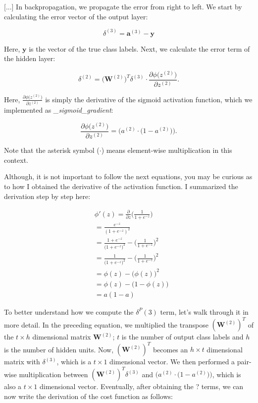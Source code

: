 \documentclass[letterpaper]{report}
\begin{document}
[...] In backpropagation, we propagate the error from right to left. We start by calculating the error vector of the output layer:

\[
\delta^{(3)} = \mathbf{a}^{(3)} - \mathbf{y} 
\]

Here, $\mathbf{y}$ is the vector of the true class labels. Next, we calculate the error term of the hidden layer:

\[
\delta^{(2)} = \big( \mathbf{W}^{(2)}  \big)^T \delta^{(3)} \cdot \frac{\partial \phi \big( z^{(2)} \big) }{\partial z^{(2)}}
.\]

Here, $\frac{\partial \phi \big( z^{(2)} \big)}{\partial z^{(2)}}$ is simply the derivative of the sigmoid activation function, which we implemented as \textit{\_sigmoid\_gradient}:

\[
\frac{\partial \phi \big( z^{(2)} \big)}{\partial z^{(2)}} = \Big( a^{(2)} \cdot \big( 1 - a^{(2)} \big) \Big).
\]

Note that the asterisk symbol ($\cdot$) means element-wise multiplication in this context.

Although, it is not important to follow the next equations, you may be curious as to how I obtained the derivative of the activation function. I summarized the derivation step by step here:

\begin{equation*} 
\begin{split}
& \phi' (z) = \frac{\partial}{\partial z} \Big( \frac{1}{1 + e^{-z}} \Big) \\
& = \frac{e^{-z}}{(1 + e^{-z})^2} \\
& = \frac{1 + e^{-z}}{\big( 1 + e^{-z} \big)^2} - \Big( \frac{1}{1 + e^{-z}}  \Big)^2  \\
& = \frac{1}{\big( 1 + e^{-z} \big)^2} - \Big( \frac{1}{1 + e^{-z}}  \Big)^2  \\
& = \phi(z) - \big(\phi(z)\big)^2 \\
& = \phi(z) - \big( 1 - \phi(z) \big) \\
& = a(1 -a)
\end{split}
\end{equation*}

To better understand how we compute the $\delta^P{(3)}$ term, let's walk through it in more detail. In the preceding equation, we multiplied the transpose $(\mathbf{W}^{(2)})^T$ of the $t \times h$ dimensional matrix $\mathbf{W}^{(2)}$; $t$ is the number of output class labels and $h$ is the number of hidden units. Now,  $(\mathbf{W}^{(2)})^T$ becomes an $h \times t$ dimensional matrix with $\delta^{(3)}$, which is a $t \times 1$ dimensional vector. We then performed a pair-wise multiplication between $(\mathbf{W}^{(2)})^T \delta^{(3)}$ and $\Big( a^{(2)} \cdot \big( 1 - a^{(2)} \big)  \Big)$, which is also a $t \times 1$ dimensional vector. Eventually, after obtaining the ? terms, we can now write the derivation of the cost function as follows:
\end{document}
